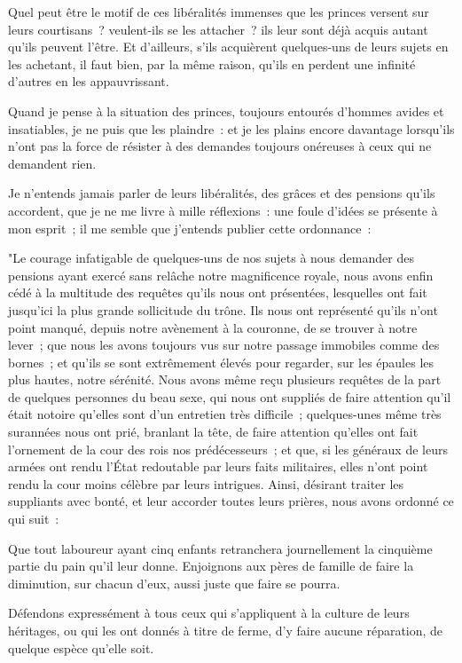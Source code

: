 \documentclass[french,twoside]{book} %
\begin{document}
\noindent Quel peut être le motif de ces libéralités immenses que les princes versent sur leurs courtisans ? veulent-ils se les attacher ? ils leur sont déjà acquis autant qu’ils peuvent l’être. Et d’ailleurs, s’ils acquièrent quelques-uns de leurs sujets en les achetant, il faut bien, par la même raison, qu’ils en perdent une infinité d’autres en les appauvrissant.\par
Quand je pense à la situation des princes, toujours entourés d’hommes avides et insatiables, je ne puis que les plaindre : et je les plains encore davantage lorsqu’ils n’ont pas la force de résister à des demandes toujours onéreuses à ceux qui ne demandent rien.\par
Je n’entends jamais parler de leurs libéralités, des grâces et des pensions qu’ils accordent, que je ne me livre à mille réflexions : une foule d’idées se présente à mon esprit ; il me semble que j’entends publier cette ordonnance :\par
"Le courage infatigable de quelques-uns de nos sujets à nous demander des pensions ayant exercé sans relâche notre magnificence royale, nous avons enfin cédé à la multitude des requêtes qu’ils nous ont présentées, lesquelles ont fait jusqu’ici la plus grande sollicitude du trône. Ils nous ont représenté qu’ils n’ont point manqué, depuis notre avènement à la couronne, de se trouver à notre lever ; que nous les avons toujours vus sur notre passage immobiles comme des bornes ; et qu’ils se sont extrêmement élevés pour regarder, sur les épaules les plus hautes, notre sérénité. Nous avons même reçu plusieurs requêtes de la part de quelques personnes du beau sexe, qui nous ont suppliés de faire attention qu’il était notoire qu’elles sont d’un entretien très difficile ; quelques-unes même très surannées nous ont prié, branlant la tête, de faire attention qu’elles ont fait l’ornement de la cour des rois nos prédécesseurs ; et que, si les généraux de leurs armées ont rendu l’État redoutable par leurs faits militaires, elles n’ont point rendu la cour moins célèbre par leurs intrigues. Ainsi, désirant traiter les suppliants avec bonté, et leur accorder toutes leurs prières, nous avons ordonné ce qui suit :\par
Que tout laboureur ayant cinq enfants retranchera journellement la cinquième partie du pain qu’il leur donne. Enjoignons aux pères de famille de faire la diminution, sur chacun d’eux, aussi juste que faire se pourra.\par
Défendons expressément à tous ceux qui s’appliquent à la culture de leurs héritages, ou qui les ont donnés à titre de ferme, d’y faire aucune réparation, de quelque espèce qu’elle soit.\par
\end{document}
